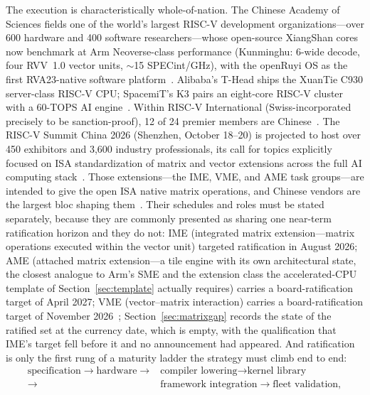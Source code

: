 The execution is characteristically whole-of-nation. The Chinese Academy of Sciences fields one of the world's largest RISC-V development organizations---over 600 hardware and 400 software researchers---whose open-source XiangShan cores now benchmark at Arm Neoverse-class performance (Kunminghu: 6-wide decode, four RVV~1.0 vector units, $\sim$15 SPECint/GHz), with the openRuyi OS as the first RVA23-native software platform~\cite{xiangshan,cas-riscv}. Alibaba's T-Head ships the XuanTie C930 server-class RISC-V CPU; SpacemiT's K3 pairs an eight-core RISC-V cluster with a 60-TOPS AI engine~\cite{c930,spacemit}. Within RISC-V International (Swiss-incorporated precisely to be sanction-proof), 12 of 24 premier members are Chinese~\cite{csis-riscv}. The RISC-V Summit China 2026 (Shenzhen, October 18--20) is projected to host over 450 exhibitors and 3,600 industry professionals, its call for topics explicitly focused on ISA standardization of matrix and vector extensions across the full AI computing stack~\cite{summit-2026}. Those extensions---the IME, VME, and AME task groups---are intended to give the open ISA native matrix operations, and Chinese vendors are the largest bloc shaping them~\cite{matrix-ext}. Their schedules and roles must be stated separately, because they are commonly presented as sharing one near-term ratification horizon and they do not: IME (integrated matrix extension---matrix operations executed within the vector unit) targeted ratification in August 2026; AME (attached matrix extension---a tile engine with its own architectural state, the closest analogue to Arm's SME and the extension class the accelerated-CPU template of Section~\ref{sec:template} actually requires) carries a board-ratification target of April 2027; VME (vector--matrix interaction) carries a board-ratification target of November 2026~\cite{imePlan,amePlan}; Section~\ref{sec:matrixgap} records the state of the ratified set at the currency date, which is empty, with the qualification that IME's target fell before it and no announcement had appeared. And ratification is only the first rung of a maturity ladder the strategy must climb end to end:
\begin{align*}
\text{specification} \rightarrow \text{hardware} \rightarrow{}& \text{compiler lowering} \rightarrow \text{kernel library}\\
\rightarrow{}& \text{framework integration} \rightarrow \text{fleet validation},
\end{align*}
